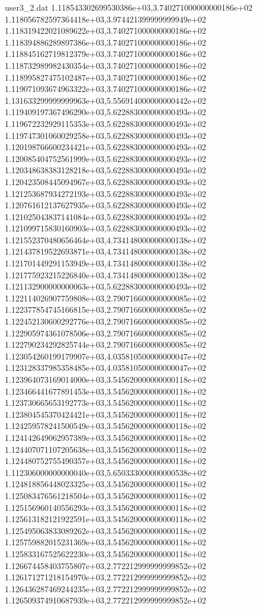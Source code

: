 \begin{filecontents}{user3_2.dat}
1.118543302699530386e+03,3.740271000000000186e+02
1.118056782597364418e+03,3.974421399999999949e+02
1.118319422021089622e+03,3.740271000000000186e+02
1.118394886289897386e+03,3.740271000000000186e+02
1.118845162719812379e+03,3.740271000000000186e+02
1.118732989982430354e+03,3.740271000000000186e+02
1.118995827475102487e+03,3.740271000000000186e+02
1.119071093674963322e+03,3.740271000000000186e+02
1.131633299999999963e+03,5.556914000000000442e+02
1.119409197367496290e+03,5.622883000000000493e+02
1.119672232929115353e+03,5.622883000000000493e+02
1.119747301060029258e+03,5.622883000000000493e+02
1.120198766600234421e+03,5.622883000000000493e+02
1.120085404752561999e+03,5.622883000000000493e+02
1.120348638383128218e+03,5.622883000000000493e+02
1.120423508445094967e+03,5.622883000000000493e+02
1.121253687934272193e+03,5.622883000000000493e+02
1.120761612137627935e+03,5.622883000000000493e+02
1.121025043837141084e+03,5.622883000000000493e+02
1.121099715830160903e+03,5.622883000000000493e+02
1.121552370480656464e+03,4.734148000000000138e+02
1.121437819522693871e+03,4.734148000000000138e+02
1.121701449291153949e+03,4.734148000000000138e+02
1.121775923215226840e+03,4.734148000000000138e+02
1.121132900000000063e+03,5.622883000000000493e+02
1.122114026907759808e+03,2.790716600000000085e+02
1.122377854745166815e+03,2.790716600000000085e+02
1.122452130600292776e+03,2.790716600000000085e+02
1.122905974361078506e+03,2.790716600000000085e+02
1.122790234292825744e+03,2.790716600000000085e+02
1.123054260199179907e+03,4.035810500000000047e+02
1.123128337985358485e+03,4.035810500000000047e+02
1.123964073169014000e+03,3.545620000000000118e+02
1.123466441677891453e+03,3.545620000000000118e+02
1.123730665653192773e+03,3.545620000000000118e+02
1.123804545370424421e+03,3.545620000000000118e+02
1.124259578241500549e+03,3.545620000000000118e+02
1.124142649062957389e+03,3.545620000000000118e+02
1.124407071107205638e+03,3.545620000000000118e+02
1.124480752755490357e+03,3.545620000000000118e+02
1.112306000000000040e+03,5.650333000000000538e+02
1.124818856448023325e+03,3.545620000000000118e+02
1.125083476561218504e+03,3.545620000000000118e+02
1.125156960140556293e+03,3.545620000000000118e+02
1.125613182121922591e+03,3.545620000000000118e+02
1.125495063833089262e+03,3.545620000000000118e+02
1.125759882015231369e+03,3.545620000000000118e+02
1.125833167525622230e+03,3.545620000000000118e+02
1.126674458403755807e+03,2.772212999999999852e+02
1.126171271218154970e+03,2.772212999999999852e+02
1.126436287469244235e+03,2.772212999999999852e+02
1.126509374910687939e+03,2.772212999999999852e+02

\end{filecontents}
